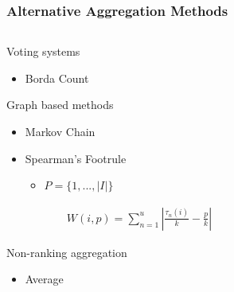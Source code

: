 \begin{frame}
\frametitle{Alternative Aggregation Methods}
\begin{columns}
	\begin{column}{0.5\textwidth}
		Voting systems
		\begin{itemize}
			\item Borda Count
		\end{itemize}
		Graph based methods
		\begin{itemize}
			\item Markov Chain 
			\item Spearman's Footrule
				\begin{itemize}
				\item $P = \{1, ..., |I|\}$
				\end{itemize}
			\begin{align*}
			W(i,p) = \displaystyle\sum_{n=1}^{u} |\frac{\tau_n(i)}{k} - \frac{p}{k}|
			\end{align*}
		\end{itemize}
		Non-ranking aggregation
		\begin{itemize}
			\item Average
		\end{itemize}
	\end{column}
	\begin{column}{0.5\textwidth}
		\begin{figure}
			\centering

\end{figure}
\end{column}
\end{columns}
\end{frame}
